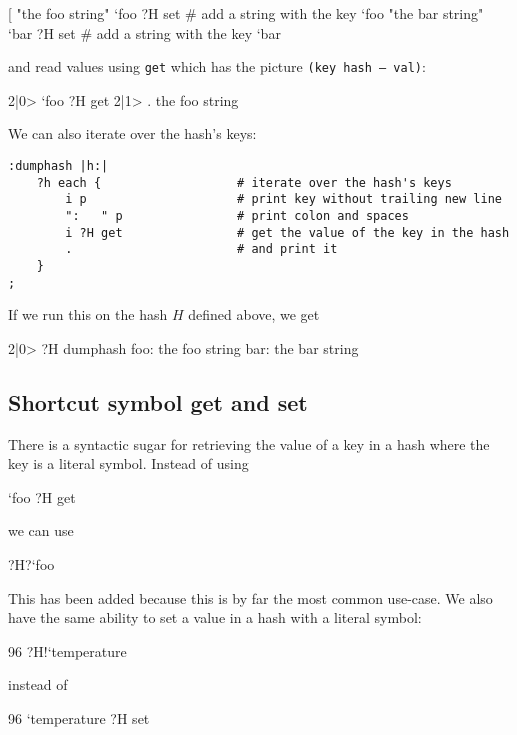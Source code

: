 \begin{v}
[%
"the foo string" `foo ?H set    # add a string with the key `foo
"the bar string" `bar ?H set    # add a string with the key `bar
\end{v}
and read values using \texttt{get} which has the picture \texttt{(key hash -- val)}:
\begin{v}
2|0> `foo ?H get
2|1> .
the foo string
\end{v}
We can also iterate over the hash's keys:
\begin{lstlisting}
:dumphash |h:|
    ?h each {                   # iterate over the hash's keys
        i p                     # print key without trailing new line
        ":   " p                # print colon and spaces
        i ?H get                # get the value of the key in the hash
        .                       # and print it
    }
;
\end{lstlisting}
If we run this on the hash $H$ defined above, we get
\begin{v}
2|0> ?H dumphash
foo:   the foo string
bar:   the bar string
\end{v}

\subsection{Shortcut symbol get and set}
There is a syntactic sugar for retrieving the value of a key in
a hash where the key is a literal symbol. Instead of using
\begin{v}
`foo ?H get
\end{v}
we can use
\begin{v}
?H?`foo
\end{v}
This has been added because this is by far the most common use-case.
We also have the same ability to set a value in a hash with a literal
symbol:
\begin{v}
96 ?H!`temperature
\end{v}
instead of
\begin{v}
96 `temperature ?H set
\end{v}

